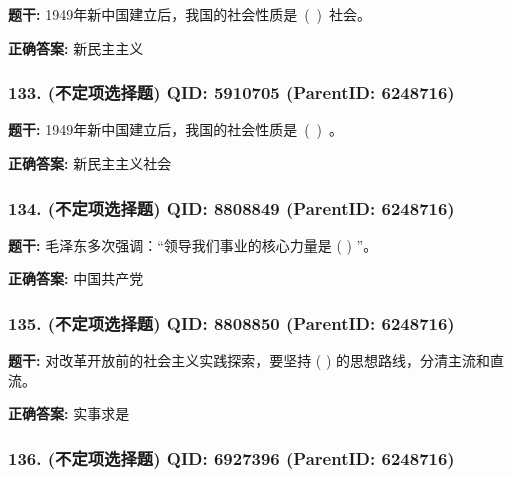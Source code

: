 \documentclass[12pt,UTF8]{ctexart}
\begin{document}
\textbf{题干:}
1949年新中国建立后，我国的社会性质是 ( ) 社会。



\textbf{正确答案:}
新民主主义

\vspace{0.3em}\hrulefill\vspace{0.7em}

\subsubsection*{133. (不定项选择题) \small QID: 5910705 (ParentID: 6248716)}

\textbf{题干:}
1949年新中国建立后，我国的社会性质是 ( ) 。



\textbf{正确答案:}
新民主主义社会

\vspace{0.3em}\hrulefill\vspace{0.7em}

\subsubsection*{134. (不定项选择题) \small QID: 8808849 (ParentID: 6248716)}

\textbf{题干:}
毛泽东多次强调：“领导我们事业的核心力量是 ( ) ”。



\textbf{正确答案:}
中国共产党

\vspace{0.3em}\hrulefill\vspace{0.7em}

\subsubsection*{135. (不定项选择题) \small QID: 8808850 (ParentID: 6248716)}

\textbf{题干:}
对改革开放前的社会主义实践探索，要坚持 ( ) 的思想路线，分清主流和直流。



\textbf{正确答案:}
实事求是

\vspace{0.3em}\hrulefill\vspace{0.7em}

\subsubsection*{136. (不定项选择题) \small QID: 6927396 (ParentID: 6248716)}
\end{document}
